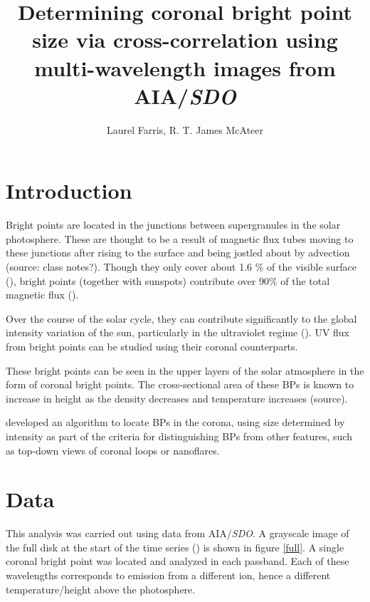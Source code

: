 \documentclass[preprint2]{aastex}
\begin{document}
\title{Determining coronal bright point size via cross-correlation using
multi-wavelength images from AIA/\textit{SDO}}
\author{Laurel Farris, R. T. James McAteer}

\begin{abstract}
\end{abstract}

\section{Introduction}\label{intro}

Bright points are located in the junctions between supergranules in the solar
photosphere. These are thought to be a result of magnetic flux tubes moving to
these junctions after rising to the surface and being jostled about by
advection (source: class notes?). Though they only cover about 1.6 \% of the
visible surface (\cite{Srivastava}), bright points (together with sunspots)
contribute over 90\% of the total magnetic flux (\cite{Howard}).

Over the course of the solar cycle, they can contribute significantly to the
global intensity variation of the sun, particularly in the ultraviolet
regime (\cite{Riethmuller}). UV flux from bright points can be studied using
their coronal counterparts.

These bright points can be seen in the upper layers of the solar atmosphere in
the form of coronal bright points. The cross-sectional area of these BPs is
known to increase in height as the density decreases and temperature increases
(source).

\cite{Alipour} developed an algorithm to locate BPs in the corona, using size determined
by intensity as part of the criteria for distinguishing BPs from other features,
such as top-down views of coronal loops or nanoflares.


\section{Data}\label{data}
This analysis was carried out using data from AIA/\textit{SDO}.
A grayscale image of the full disk at the start of the time series () is shown
in figure \ref{full}.
A single coronal bright point was located and analyzed in each passband.
Each of these wavelengths corresponds to emission
from a different ion, hence a different temperature/height above the
photosphere.
\end{document}
